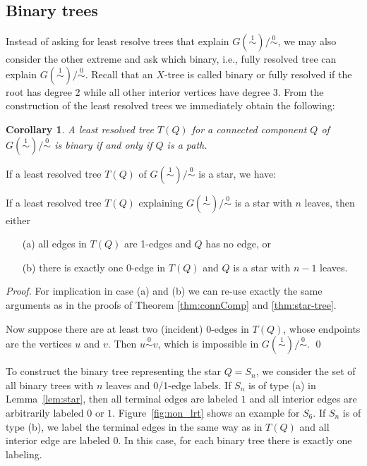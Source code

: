 \documentclass[smallextended]{svjour3}
\newcommand{\Ro}{\mathrel{\overset{0}{\sim}}}
\newcommand{\Rl}{\mathrel{\overset{1}{\sim}}}
\newtheorem{cor}[thm]{Corollary}
\begin{document}
\subsection{Binary trees}

Instead of asking for least resolve trees that explain $G(\Rl)/\Ro$, we may
also consider the other extreme and ask which binary, i.e., fully resolved
tree can explain $G(\Rl)/\Ro$. Recall that an $X$-tree is called binary or
fully resolved if the root has degree $2$ while all other interior vertices
have degree $3$.  From the construction of the least resolved trees we
immediately obtain the following:
\begin{cor}
  A least resolved tree $T(Q)$ for a connected component $Q$ of
  $G(\Rl)/\Ro$ is binary if and only if $Q$ is a path.
\end{cor}

If a least resolved tree $T(Q)$ of $G(\Rl)/\Ro$ is a star, we have:
\begin{lemma}\label{lem:star}
  If a least resolved tree $T(Q)$ explaining $G(\Rl)/\Ro$ is a star
  with $n$ leaves, then either
  \begin{itemize}
    \item[(a)] all edges in $T(Q)$ are 1-edges and $Q$ has no edge, or 
    \item[(b)] there is exactly one 0-edge in $T(Q)$ and $Q$ is a star
        with $n-1$ leaves.
    \end{itemize}
  \end{lemma}
\begin{proof}
  For implication in case (a) and (b) we can re-use exactly the same
  arguments as in the proofs of Theorem \ref{thm:connComp} and
  \ref{thm:star-tree}.

  Now suppose there are at least two (incident) 0-edges in $T(Q)$, whose
  endpoints are the vertices $u$ and $v$. Then $u\Ro v$, which is
  impossible in $G(\Rl)/\Ro$.  \qed
\end{proof}

To construct the binary tree representing the star $Q=S_n$, we consider the
set of all binary trees with $n$ leaves and 0/1-edge labels. If $S_n$ is of
type (a) in Lemma~\ref{lem:star}, then all terminal edges are labeled $1$
and all interior edges are arbitrarily labeled $0$ or $1$.
Figure~\ref{fig:non_lrt} shows an example for $S_6$.  If $S_n$ is of type
(b), we label the terminal edges in the same way as in $T(Q)$ and all
interior edge are labeled 0. In this case, for each binary tree there is
exactly one labeling.
\end{document}
